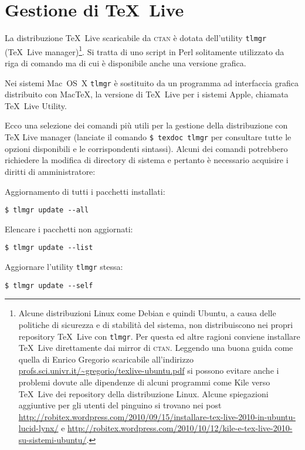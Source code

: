 \section{Gestione di \TeX\ Live}

La distribuzione \TeX\ Live scaricabile da \textsc{ctan} è dotata dell'utility \texttt{tlmgr} (\TeX\ Live manager)\footnote{Alcune distribuzioni Linux come Debian e quindi Ubuntu, a causa delle politiche di sicurezza e di stabilità del sistema, non distribuiscono nei propri repository \TeX\ Live con \texttt{tlmgr}. Per questa ed altre ragioni conviene installare \TeX\ Live direttamente dai mirror di \textsc{ctan}. Leggendo una buona guida come quella di Enrico Gregorio scaricabile all'indirizzo \url{profs.sci.univr.it/~gregorio/texlive-ubuntu.pdf} si possono evitare anche i problemi dovute alle dipendenze di alcuni programmi come Kile verso \TeX~Live dei repository della distribuzione Linux. Alcune spiegazioni aggiuntive per gli utenti del pinguino si trovano nei post \url{http://robitex.wordpress.com/2010/09/15/installare-tex-live-2010-in-ubuntu-lucid-lynx/} e \url{http://robitex.wordpress.com/2010/10/12/kile-e-tex-live-2010-su-sistemi-ubuntu/}.}. Si tratta di uno script in Perl solitamente utilizzato da riga di comando ma di cui è disponibile anche una versione grafica.

Nei sistemi Mac~OS~X \texttt{tlmgr} è sostituito da un programma ad interfaccia grafica distribuito con Mac\TeX, la versione di \TeX\ Live per i sistemi Apple, chiamata \TeX{}~Live Utility.

Ecco una selezione dei comandi più utili per la gestione della distribuzione con \TeX{} Live manager (lanciate il comando \verb=$ texdoc tlmgr= per consultare tutte le opzioni disponibili e le corrispondenti sintassi). Alcuni dei comandi potrebbero richiedere la modifica di directory di sistema e pertanto è necessario acquisire i diritti di amministratore:

Aggiornamento di tutti i pacchetti installati:
\begin{verbatim}
$ tlmgr update --all
\end{verbatim}

Elencare i pacchetti non aggiornati:
\begin{verbatim}
$ tlmgr update --list
\end{verbatim}

Aggiornare l'utility \texttt{tlmgr} stessa:
\begin{verbatim}
$ tlmgr update --self
\end{verbatim}

